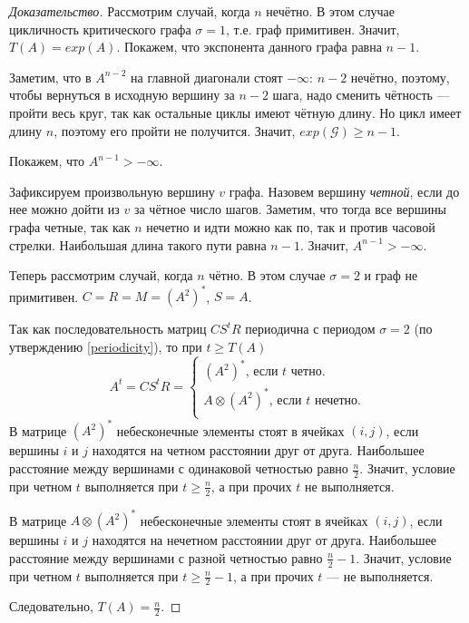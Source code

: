 \documentclass[12pt]{article}
\begin{document}
\begin{proof}[Доказательство]
Рассмотрим случай, когда $n$ нечётно. В этом случае цикличность критического графа $\sigma = 1$, т.е. граф примитивен. Значит, $T(A) = exp(A)$. Покажем, что экспонента данного графа равна $n - 1$.

Заметим, что в $A^{n - 2}$ на главной диагонали стоят $-\infty$: $n - 2$ нечётно, поэтому, чтобы вернуться в исходную вершину за $n - 2$ шага, надо сменить чётность --- пройти весь круг, так как остальные циклы имеют чётную длину. Но цикл имеет длину $n$, поэтому его пройти не получится. Значит, $exp(\mathcal{G}) \ge n - 1$.

Покажем, что $A^{n - 1} > -\infty$.

Зафиксируем произвольную вершину $v$ графа. Назовем вершину \textit{четной}, если до нее можно дойти из $v$ за чётное число шагов. Заметим, что тогда все вершины графа четные, так как $n$ нечетно и идти можно как по, так и против часовой стрелки. Наибольшая длина такого пути равна $n - 1$. Значит, $A^{n - 1} > -\infty$.

Теперь рассмотрим случай, когда $n$ чётно. В этом случае $\sigma = 2$ и граф не примитивен. $C = R = M = (A^2)^*$, $S = A$.


Так как последовательность матриц $CS^tR$ периодична с периодом $\sigma = 2$ (по утверждению \ref{periodicity}), то при $t \ge T(A)$ \begin{equation*}
A^t = CS^tR = \begin{cases}
(A^2)^* \text{, если } t \text{ четно.}\\
A \otimes (A^2)^*\text{, если } t \text{ нечетно.}\\
\end{cases}
\end{equation*}
В матрице $(A^2)^*$ небесконечные элементы стоят в ячейках $(i, j)$, если вершины $i$ и $j$ находятся на четном расстоянии друг от друга. Наибольшее расстояние между вершинами с одинаковой четностью равно $\frac{n}{2}$. Значит, условие при четном $t$ выполняется при $t \ge \frac{n}{2}$, а при прочих $t$ не выполняется.

В матрице $A\otimes(A^2)^*$ небесконечные элементы стоят в ячейках $(i, j)$, если вершины $i$ и $j$ находятся на нечетном расстоянии друг от друга. Наибольшее расстояние между вершинами с разной четностью равно $\frac{n}{2} - 1$. Значит, условие при четном $t$ выполняется при $t \ge \frac{n}{2} - 1$, а при прочих $t$ --- не выполняется.

Следовательно, $T(A) = \frac{n}{2}$.
\end{proof}
\end{document}
